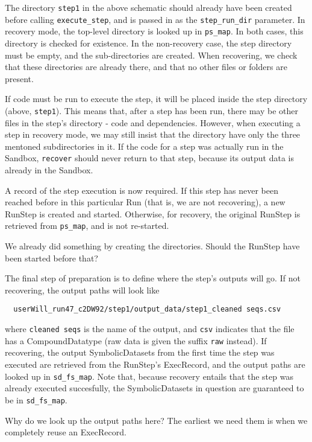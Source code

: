 \documentclass[12pt]{article}
\newcommand{\code}[1]{\texttt{#1}}
\newcommand{\alert}[1]{\color{red}#1\color{black}}
\begin{document}
The directory \code{step1} in the above schematic should already have been
created before calling \code{execute\_step}, and is passed in as the
\code{step\_run\_dir} parameter. In recovery mode, the top-level directory is
looked up in \code{ps\_map}. In both cases, this directory is checked for
existence. In the non-recovery case, the step directory must be empty, and the
sub-directories are created. When recovering, we check that these directories
are already there, and that no other files or folders are present.

If code must be run to execute the step, it will be placed inside the step
directory (above, \code{step1}). This means that, after a step has been run,
there may be other files in the step's directory - code and dependencies.
However, when executing a step in recovery mode, we may still insist that the
directory have only the three mentoned subdirectories in it. If the code for a
step was actually run in the Sandbox, \code{recover} should never return to
that step, because its output data is already in the Sandbox. 

A record of the step execution is now required. If this step has never been
reached before in this particular Run (that is, we are not recovering), a new
RunStep is created and started. Otherwise, for recovery, the original RunStep
is retrieved from \code{ps\_map}, and is not re-started. 

\alert{We already did something by creating the directories. Should the RunStep
have been started before that?}

The final step of preparation is to define where the step's outputs will go. If 
not recovering, the output paths will look like

\begin{verbatim}
  userWill_run47_c2DW92/step1/output_data/step1_cleaned seqs.csv
\end{verbatim}

where \code{cleaned seqs} is the name of the output, and \code{csv} indicates
that the file has a CompoundDatatype (raw data is given the suffix \code{raw}
instead). If recovering, the output SymbolicDatasets from the first time the
step was executed are retrieved from the RunStep's ExecRecord, and the output
paths are looked up in \code{sd\_fs\_map}. Note that, because recovery entails
that the step was already executed succesfully, the SymbolicDatasets in
question are guaranteed to be in \code{sd\_fs\_map}.

\alert{Why do we look up the output paths here? The earliest we need them is
when we completely reuse an ExecRecord.}
\end{document}
